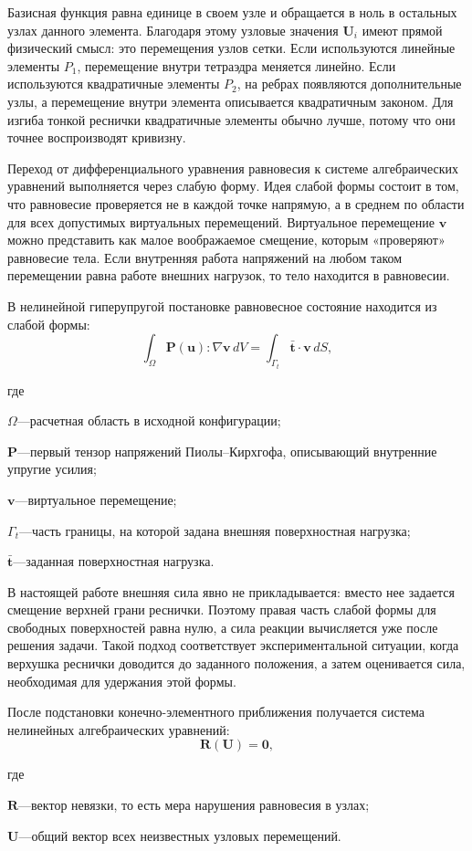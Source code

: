 \documentclass[14pt,a4paper]{extarticle}
\newif\ifwherefirst
\newcommand{\whereitem}[2]{%
    \ifwherefirst
        \wherefirstfalse
        #1\hspace{0.25em}---\hspace{0.25em}#2\par
    \else
        \noindent\hspace*{\parindent}\hphantom{где\enspace}#1\hspace{0.25em}---\hspace{0.25em}#2\par
    \fi
}
\newenvironment{whereblock}{%
    \vspace*{-1.55\baselineskip}%
    \begingroup
    \singlespacing
    \wherefirsttrue
    \par\indent где\enspace\ignorespaces
}{%
    \par\endgroup
    \par\vspace{\baselineskip}
}
\begin{document}
Базисная функция равна единице в своем узле и обращается в ноль в остальных узлах данного элемента. Благодаря этому узловые значения \(\mathbf{U}_i\) имеют прямой физический смысл: это перемещения узлов сетки. Если используются линейные элементы \(P_1\), перемещение внутри тетраэдра меняется линейно. Если используются квадратичные элементы \(P_2\), на ребрах появляются дополнительные узлы, а перемещение внутри элемента описывается квадратичным законом. Для изгиба тонкой реснички квадратичные элементы обычно лучше, потому что они точнее воспроизводят кривизну.

Переход от дифференциального уравнения равновесия к системе алгебраических уравнений выполняется через слабую форму. Идея слабой формы состоит в том, что равновесие проверяется не в каждой точке напрямую, а в среднем по области для всех допустимых виртуальных перемещений. Виртуальное перемещение \(\mathbf{v}\) можно представить как малое воображаемое смещение, которым «проверяют» равновесие тела. Если внутренняя работа напряжений на любом таком перемещении равна работе внешних нагрузок, то тело находится в равновесии.

В нелинейной гиперупругой постановке равновесное состояние находится из слабой формы:
\begin{equation}
    \int_{\Omega}
    \mathbf{P}(\mathbf{u}):\nabla\mathbf{v}\,dV
    =
    \int_{\Gamma_t}
    \bar{\mathbf{t}}\cdot\mathbf{v}\,dS,
\end{equation}
\begin{whereblock}
\whereitem{\(\Omega\)}{расчетная область в исходной конфигурации;}
\whereitem{\(\mathbf{P}\)}{первый тензор напряжений Пиолы--Кирхгофа, описывающий внутренние упругие усилия;}
\whereitem{\(\mathbf{v}\)}{виртуальное перемещение;}
\whereitem{\(\Gamma_t\)}{часть границы, на которой задана внешняя поверхностная нагрузка;}
\whereitem{\(\bar{\mathbf{t}}\)}{заданная поверхностная нагрузка.}
\end{whereblock}

В настоящей работе внешняя сила явно не прикладывается: вместо нее задается смещение верхней грани реснички. Поэтому правая часть слабой формы для свободных поверхностей равна нулю, а сила реакции вычисляется уже после решения задачи. Такой подход соответствует экспериментальной ситуации, когда верхушка реснички доводится до заданного положения, а затем оценивается сила, необходимая для удержания этой формы.

После подстановки конечно-элементного приближения получается система нелинейных алгебраических уравнений:
\begin{equation}
    \mathbf{R}(\mathbf{U})=\mathbf{0},
\end{equation}
\begin{whereblock}
\whereitem{\(\mathbf{R}\)}{вектор невязки, то есть мера нарушения равновесия в узлах;}
\whereitem{\(\mathbf{U}\)}{общий вектор всех неизвестных узловых перемещений.}
\end{whereblock}
\end{document}
